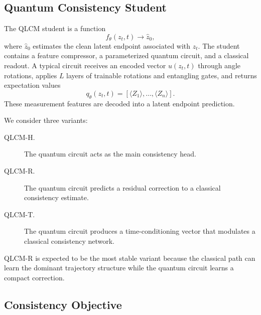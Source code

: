 \documentclass[11pt]{article}
\begin{document}
\subsection{Quantum Consistency Student}
\label{sec:quantum-student}

The QLCM student is a function
\begin{equation}
    f_\theta(z_t, t) \rightarrow \hat{z}_0,
\end{equation}
where $\hat{z}_0$ estimates the clean latent endpoint associated with $z_t$.
The student contains a feature compressor, a parameterized quantum circuit, and
a classical readout. A typical circuit receives an encoded vector
$u(z_t,t)$ through angle rotations, applies $L$ layers of trainable rotations and
entangling gates, and returns expectation values
\begin{equation}
    q_\theta(z_t,t) =
    \left[
    \langle Z_1 \rangle,\ldots,\langle Z_n \rangle
    \right].
\end{equation}
These measurement features are decoded into a latent endpoint prediction.

We consider three variants:
\begin{description}
    \item[QLCM-H.] The quantum circuit acts as the main consistency head.
    \item[QLCM-R.] The quantum circuit predicts a residual correction to a
    classical consistency estimate.
    \item[QLCM-T.] The quantum circuit produces a time-conditioning vector that
    modulates a classical consistency network.
\end{description}

QLCM-R is expected to be the most stable variant because the classical path can
learn the dominant trajectory structure while the quantum circuit learns a
compact correction.

\subsection{Consistency Objective}
\label{sec:consistency-objective}
\end{document}
